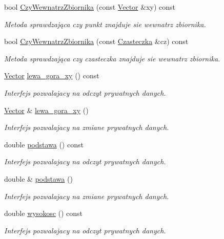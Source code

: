 \begin{DoxyCompactItemize}
bool \hyperlink{class_zbiornik_af11180e2f8fdca6269b1f825ad3bceff}{Czy\+Wewnatrz\+Zbiornika} (const \hyperlink{class_vector}{Vector} \&xy) const 
\begin{DoxyCompactList}\small\item\em Metoda sprawdzająca czy punkt znajduje sie wewnatrz zbiornika. \end{DoxyCompactList}\item 
bool \hyperlink{class_zbiornik_ae158efae449beb3d760bb18f5337ac72}{Czy\+Wewnatrz\+Zbiornika} (const \hyperlink{class_czasteczka}{Czasteczka} \&cz) const 
\begin{DoxyCompactList}\small\item\em Metoda sprawdzająca czy czasteczka znajduje sie wewnatrz zbiornika. \end{DoxyCompactList}\item 
\hyperlink{class_vector}{Vector} \hyperlink{class_zbiornik_a811829ed13289d4fad56ae5fcd92bec8}{lewa\+\_\+gora\+\_\+xy} () const 
\begin{DoxyCompactList}\small\item\em Interfejs pozwalajacy na odczyt prywatnych danych. \end{DoxyCompactList}\item 
\hyperlink{class_vector}{Vector} \& \hyperlink{class_zbiornik_aa3e1369b230b9e0dedd6a364a75dcbfc}{lewa\+\_\+gora\+\_\+xy} ()
\begin{DoxyCompactList}\small\item\em Interfejs pozwalajacy na zmiane prywatnych danych. \end{DoxyCompactList}\item 
double \hyperlink{class_zbiornik_ac64f411a313024c52dbc1c18897df573}{podstawa} () const 
\begin{DoxyCompactList}\small\item\em Interfejs pozwalajacy na odczyt prywatnych danych. \end{DoxyCompactList}\item 
double \& \hyperlink{class_zbiornik_a7749987df3c4966a1e45908ef8a72bf3}{podstawa} ()
\begin{DoxyCompactList}\small\item\em Interfejs pozwalajacy na zmiane prywatnych danych. \end{DoxyCompactList}\item 
double \hyperlink{class_zbiornik_a72ab0eb9f3562de0ea90e176f515be42}{wysokosc} () const 
\begin{DoxyCompactList}\small\item\em Interfejs pozwalajacy na odczyt prywatnych danych. \end{DoxyCompactList}\item 

\end{DoxyCompactItemize}
